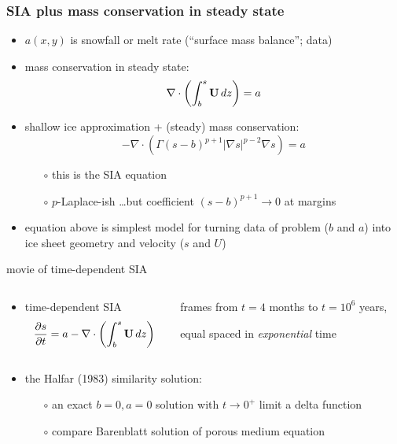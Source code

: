 \documentclass[hide notes,intlimits]{beamer}
\newcommand{\Div}{\nabla\cdot}
\begin{document}
\begin{frame}
  \frametitle{SIA plus mass conservation in steady state}

\begin{itemize}
\item $a(x,y)$ is snowfall or melt rate (``surface mass balance''; data)
\item mass conservation in steady state: 
  $$\Div \left(  \int_b^s {\bf U}\, dz \right)  =  a$$
\item shallow ice approximation + (steady) mass conservation:
  $$- \Div \left(\Gamma (s-b)^{p+1} | \nabla s |^{p-2} \nabla s  \right) =  a$$
  \begin{itemize}
  \vspace{-0.2in}
  \item[$\circ$] this is the SIA equation
  \item[$\circ$] $p$-Laplace-ish \dots but coefficient $(s-b)^{p+1} \to 0$ at margins
  \end{itemize}
\item equation above is simplest model for turning data of problem ($b$ and $a$) into ice sheet geometry and velocity ($s$ and $U$)
\end{itemize}
\end{frame}


\begin{frame}{movie of time-dependent SIA}

\begin{columns}
\begin{column}{0.4\textwidth}
\small
\begin{itemize}
\item time-dependent SIA
  $$\frac{\partial s}{\partial t} = a - \Div \left(  \int_b^s {\bf U}\, dz \right)$$
\end{itemize}
\end{column}

\begin{column}{0.65\textwidth}
\vspace{-0.25in}

\begin{center}

\bigskip
\tiny
frames from $t=4$ months to $t = 10^6$ years,

equal spaced in \emph{exponential} time
\end{center}
\end{column}
\end{columns}


\begin{itemize}
\scriptsize
\item the Halfar (1983) similarity solution:
  \begin{itemize}
  \scriptsize
  \item[$\circ$] an exact $b=0,a=0$ solution with $t\to 0^+$ limit a delta function
  \item[$\circ$] compare Barenblatt solution of porous medium equation
  \end{itemize}
\end{itemize}
\end{frame}
\end{document}
